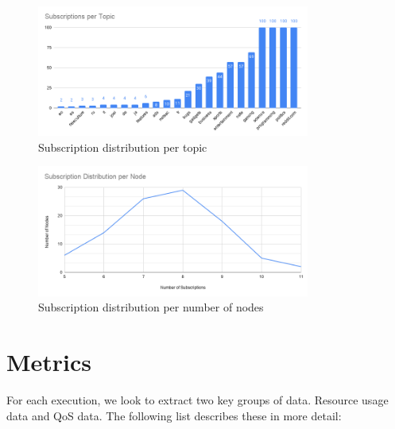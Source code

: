 \begin{figure}[!htb]
  \centering
  \includegraphics[width=0.8\textwidth]{img/subscriptions-per-topic.png}
  \caption{Subscription distribution per topic}
  \label{fig:subscriptions-per-topic}
\end{figure}

\begin{figure}[!htb]
  \centering
  \includegraphics[width=0.8\textwidth]{img/subscription-distribution-per-node.png}
  \caption{Subscription distribution per number of nodes}
  \label{fig:subscription-distribution-per-node}
\end{figure}

\section{Metrics}\label{metrics}

For each execution, we look to extract two key groups of data. Resource usage
data and QoS data. The following list describes these in more detail:

